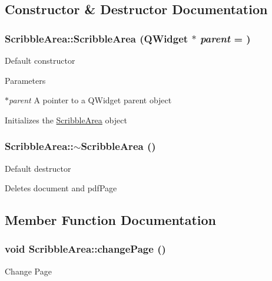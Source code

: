 \subsection{Constructor \& Destructor Documentation}
\hypertarget{classScribbleArea_a3560f2a44b46531591a1f4b1e42ea86f}{
\subsubsection[{ScribbleArea}]{\setlength{\rightskip}{0pt plus 5cm}ScribbleArea::ScribbleArea (QWidget $\ast$ {\em parent} = {})}}
\label{classScribbleArea_a3560f2a44b46531591a1f4b1e42ea86f}
Default constructor 
\begin{DoxyParams}{Parameters}
\item[{\em $\ast$parent}]A pointer to a QWidget parent object\end{DoxyParams}
Initializes the \hyperlink{classScribbleArea}{ScribbleArea} object \hypertarget{classScribbleArea_a5067be9932626a2ea5d041cb0f53a070}{
\subsubsection[{$\sim$ScribbleArea}]{\setlength{\rightskip}{0pt plus 5cm}ScribbleArea::$\sim$ScribbleArea ()}}
\label{classScribbleArea_a5067be9932626a2ea5d041cb0f53a070}
Default destructor

Deletes document and pdfPage 

\subsection{Member Function Documentation}
\hypertarget{classScribbleArea_a898d76738b51ed00fbb3aeed87ca1ce4}{
\subsubsection[{changePage}]{\setlength{\rightskip}{0pt plus 5cm}void ScribbleArea::changePage ()}}
\label{classScribbleArea_a898d76738b51ed00fbb3aeed87ca1ce4}
Change Page

